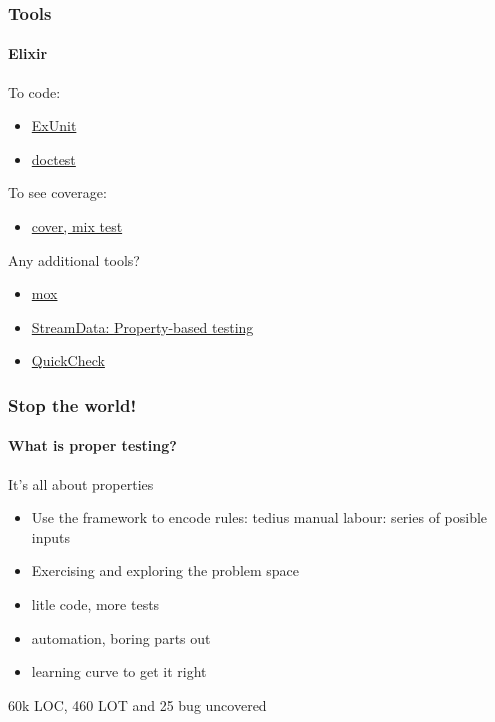 \documentclass{beamer}
\begin{document}
  \begin{frame}
    \frametitle{Tools}
    \framesubtitle{Elixir}
    
    To code:
    \begin{itemize}[<+->]
    \item \href{https://hexdocs.pm/ex_unit/ExUnit.html}{ExUnit}
    \item \href{https://hexdocs.pm/ex_unit/ExUnit.DocTest.html}{doctest}
    \end{itemize}
    To see coverage:
    \begin{itemize}[<+->]
    \item \href{http://erlang.org/doc/apps/tools/cover_chapter.html}{cover, mix test}
    \end{itemize}
    Any additional tools?
    \begin{itemize}[<+->]
    \item \href{https://github.com/plataformatec/mox}{mox}
    \item \href{https://elixir-lang.org/blog/2017/10/31/stream-data-property-based-testing-and-data-generation-for-elixir}{StreamData: Property-based testing}
    \item \href{http://www.quviq.com/downloads/}{QuickCheck}
    \end{itemize}    
  \end{frame}  

  \begin{frame}
    \frametitle{Stop the world!}
    \framesubtitle{What is proper testing?}

    \begin{block}{It's all about properties}
    \begin{itemize}
    \item Use the framework to encode rules: tedius manual labour: series of posible inputs
    \item Exercising and exploring the problem space
    \end{itemize}
    \end{block}
    
    \pause
        
    \begin{block}{}
    \begin{itemize}
    \item litle code, more tests
    \item automation, boring parts out
    \item learning curve to get it right
    \end{itemize}
    \end{block}
    
    \pause
    
    \begin{examples}
    60k LOC, 460 LOT and 25 bug uncovered
    \end{examples}
    
  \end{frame}
  
\end{document}
